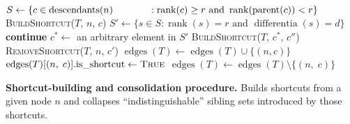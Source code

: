 
 \begin{algorithm}[h]
  \begin{algorithmic}[1]
  \small{
      \State $S \gets \{c \in \operatorname{descendants}(n) \\~~~~~~~~~~~: \operatorname{rank}(c) \ge r \text{ and }  \operatorname{rank}(\operatorname{parent}(c)) < r\}$
        \textsc{BuildShortcut}($T$, $n$, $c$)
      \EndFor
        \State $S' \gets \{s \in S : \operatorname{rank}(s) = r \text{ and } \operatorname{differentia}(s) = d\}$
          \State \textbf{continue}
        \EndIf
        \State $c^* \gets$ an arbitrary element in $S'$
            \State \textsc{BuildShortcut}($T$, $c^*$, $c''$)
          \EndFor
          \State \textsc{RemoveShortcut}($T$, $n$, $c'$)
        \EndFor
      \EndFor
    \EndFunction
      \State $\operatorname{edges}(T) \gets \operatorname{edges}(T) \cup \{(n, c)\}$
      \State $\operatorname{edges}(T)[(n,\; c)]\text{.is\_shortcut} \gets \textsc{True}$
    \EndFunction
        \State $\operatorname{edges}(T) \gets \operatorname{edges}(T) \setminus \{(n,\; c)\}$
    \EndFunction
  }
  \end{algorithmic}
  \caption{\textbf{Shortcut-building and consolidation procedure.} \small Builds shortcuts from a given node $n$ and collapses ``indistinguishable'' sibling sets introduced by those shortcuts. \vspace{-1.5em}}
  \label{alg:consolidation}
\end{algorithm}
